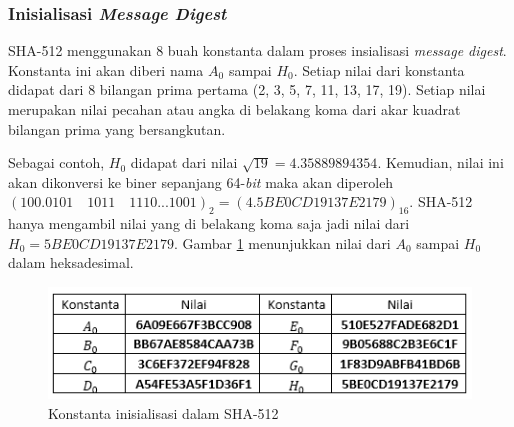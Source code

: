 \subsubsection{Inisialisasi \textit{Message Digest}}
SHA-512 menggunakan 8 buah konstanta dalam proses insialisasi \textit{message digest}. Konstanta ini akan diberi nama \begin{math}A_0\end{math} sampai \begin{math}H_0\end{math}. Setiap nilai dari konstanta didapat dari 8 bilangan prima pertama (2, 3, 5, 7, 11, 13, 17, 19). Setiap nilai merupakan nilai pecahan atau angka di belakang koma dari akar kuadrat bilangan prima yang bersangkutan.

Sebagai contoh, \begin{math}H_0\end{math} didapat dari nilai \begin{math}\sqrt{19} = 4.35889894354\end{math}. Kemudian, nilai ini akan dikonversi ke biner sepanjang 64-\textit{bit} maka akan diperoleh \begin{math}(100.0101\quad 1011\quad 1110 ... 1001)_2=(4.5BE0CD19137E2179)_{16}\end{math}. SHA-512 hanya mengambil nilai yang di belakang koma saja jadi nilai dari \begin{math}H_0 = 5BE0CD19137E2179\end{math}. Gambar \ref{fig:konstanta_sha} menunjukkan nilai dari \begin{math}A_0\end{math} sampai \begin{math}H_0\end{math} dalam heksadesimal.

\begin{figure}[H]
	\includegraphics[scale=0.8]{Gambar/konstanta_sha}
	\centering
	\caption{Konstanta inisialisasi dalam SHA-512}\label{fig:konstanta_sha}
\end{figure}

